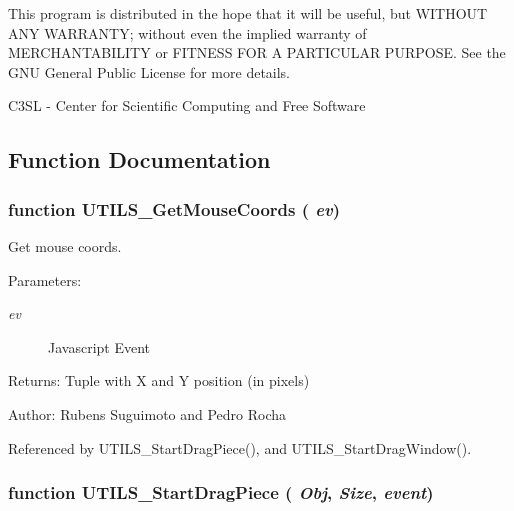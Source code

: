 This program is distributed in the hope that it will be useful, but WITHOUT ANY WARRANTY; without even the implied warranty of MERCHANTABILITY or FITNESS FOR A PARTICULAR PURPOSE. See the GNU General Public License for more details.

C3SL - Center for Scientific Computing and Free Software 

\subsection{Function Documentation}
\subsubsection[UTILS\_\-GetMouseCoords]{\setlength{\rightskip}{0pt plus 5cm}function UTILS\_\-GetMouseCoords ( {\em ev})}\label{dragpiece_8js_d87f2f47e68578008de810783d30ad5f}


Get mouse coords. 

\begin{Desc}
\item[Parameters:]
\begin{description}
\item[{\em ev}]Javascript Event \end{description}
\end{Desc}
\begin{Desc}
\item[Returns:]Tuple with X and Y position (in pixels) \end{Desc}
\begin{Desc}
\item[Author:]Rubens Suguimoto and Pedro Rocha \end{Desc}


Referenced by UTILS\_\-StartDragPiece(), and UTILS\_\-StartDragWindow().
\subsubsection[UTILS\_\-StartDragPiece]{\setlength{\rightskip}{0pt plus 5cm}function UTILS\_\-StartDragPiece ( {\em Obj}, \/   {\em Size}, \/   {\em event})}\label{dragpiece_8js_04cec6183bea27a600df0cd7429e6551}


